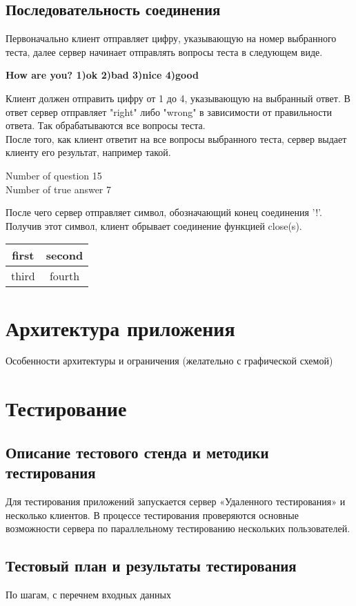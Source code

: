 \documentclass[12pt,a4paper]{report}
\begin{document}
\subsection{Последовательность соединения}
Первоначально клиент отправляет цифру, указывающую на номер выбранного теста, далее сервер начинает  отправлять вопросы теста в следующем виде.
\begin{center}
\textbf{How are you? 1)ok 2)bad 3)nice 4)good}
\end{center}
Клиент должен отправить цифру от 1 до 4, указывающую на выбранный ответ. В ответ сервер отправляет "right" либо "wrong" в зависимости от правильности ответа. Так обрабатываются все вопросы теста.\\
После того, как клиент ответит на все вопросы выбранного теста, сервер выдает клиенту его результат, например такой.\begin{center}
Number of question 15\\
Number of true answer 7
\end{center}
После чего сервер отправляет символ, обозначающий конец соединения '!'. Получив этот символ, клиент обрывает соединение функцией close(s). 
\begin{tabular}{|c|c|}
\hline 
first & second \\ 
\hline 
third & fourth \\ 
\hline 
\end{tabular} 
\section{Архитектура приложения}
Особенности архитектуры и ограничения (желательно с графической схемой) 

\section{Тестирование}
\subsection{Описание тестового стенда и методики тестирования}
Для тестирования приложений запускается сервер «Удаленного тестирования» и несколько клиентов. В процессе тестирования проверяются основные возможности сервера по параллельному тестированию нескольких пользователей.
\subsection{Тестовый план и результаты тестирования}
По шагам, с перечнем входных данных
\end{document}
